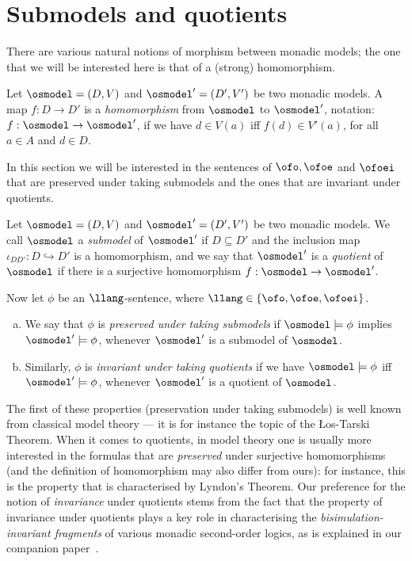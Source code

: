 
\section{Submodels and quotients}
\label{sec:inv}

There are various natural notions of morphism between monadic models; the one 
that we will be interested here is that  of a (strong) homomorphism.

\begin{definition}
\label{d:hom}
Let $\osmodel = (D,V)$ and $\osmodel' = (D',V')$ be two monadic models.
A map $f: D \to D'$ is a \emph{homomorphism} from $\osmodel$ to $\osmodel'$, 
notation: $f: \osmodel \to \osmodel'$, if we have $d \in V(a)$ iff $f(d) \in 
V'(a)$, for all $a \in A$ and $d \in D$.
\end{definition}

In this section we will be interested in the sentences of $\ofo, \ofoe$ and 
$\ofoei$ that are preserved under taking submodels and the ones that are 
invariant under quotients.

\begin{definition}
\label{d:inv}
Let $\osmodel = (D,V)$ and $\osmodel' = (D',V')$ be two monadic models.
We call $\osmodel$ a \emph{submodel} of $\osmodel'$ if $D \subseteq D'$ and 
the inclusion map $\iota_{DD'}: D \hookrightarrow D'$ is a homomorphism, and 
we say that $\osmodel'$ is a \emph{quotient} of $\osmodel$ if there 
is a surjective homomorphism $f: \osmodel \to \osmodel'$.

Now let $\phi$ be an $\llang$-sentence, where $\llang \in \{ \ofo, \ofoe, \ofoei
\}$.
\begin{enumerate}[(a)]
\item\label{d:inv:i} 
We say that $\phi$ is \emph{preserved under taking submodels} if 
$\osmodel \models \phi$ implies $\osmodel' \models \phi$, whenever
$\osmodel'$ is a submodel of $\osmodel$.
\item\label{d:inv:ii} Similarly, $\phi$ is \emph{invariant under taking quotients} if we have
$\osmodel \models \phi$ iff $\osmodel' \models \phi$, whenever $\osmodel'$ is
a quotient of $\osmodel$.
\end{enumerate}
\end{definition}

The first of these properties (preservation under taking submodels) is well
known from classical model theory --- it is for instance the topic of the
{\L}os-Tarski Theorem.
When it comes to quotients, in model theory one is usually more interested in
the formulas that are \emph{preserved} under surjective homomorphisms (and
the definition of homomorphism may also differ from ours): for instance, this 
is the property that is characterised by Lyndon's Theorem.
Our preference for the notion of \emph{invariance} under quotients stems from 
the fact that the property of invariance under quotients plays a key role in
characterising the \emph{bisimulation-invariant fragments} of various monadic
second-order logics, as is explained in our companion paper~\cite{companionWEAK}.


